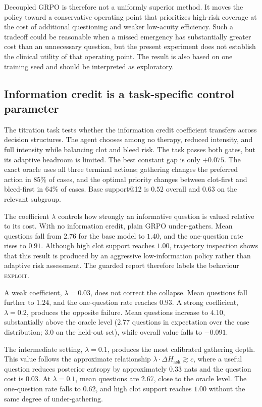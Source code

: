\documentclass{article}
\begin{document}
Decoupled GRPO is therefore not a uniformly superior method. It moves the policy
toward a conservative operating point that prioritizes high-risk coverage at the
cost of additional questioning and weaker low-acuity efficiency. Such a tradeoff
could be reasonable when a missed emergency has substantially greater cost than
an unnecessary question, but the present experiment does not establish the
clinical utility of that operating point. The result is also based on one training
seed and should be interpreted as exploratory.


\FloatBarrier
\subsection{Information credit is a task-specific control parameter}
\label{subsec:titration-results}

The titration task tests whether the information credit coefficient transfers
across decision structures. The agent chooses among no therapy, reduced intensity,
and full intensity while balancing clot and bleed risk. The task passes both gates,
but its adaptive headroom is limited. The best constant gap is only $+0.075$.
The exact oracle uses all three terminal actions; gathering changes the preferred
action in $85\%$ of cases, and the optimal priority changes between clot-first and
bleed-first in $64\%$ of cases. Base support@12 is $0.52$ overall and $0.63$ on
the relevant subgroup.

The coefficient $\lambda$ controls how strongly an informative question is valued
relative to its cost. With no information credit, plain GRPO under-gathers. Mean
questions fall from $2.76$ for the base model to $1.40$, and the one-question
rate rises to $0.91$. Although high clot support reaches $1.00$, trajectory
inspection shows that this result is produced by an aggressive low-information
policy rather than adaptive risk assessment. The guarded report therefore labels
the behaviour \textsc{exploit}.

A weak coefficient, $\lambda{=}0.03$, does not correct the collapse. Mean
questions fall further to $1.24$, and the one-question rate reaches $0.93$. A
strong coefficient, $\lambda{=}0.2$, produces the opposite failure. Mean
questions increase to $4.10$, substantially above the oracle level ($2.77$
questions in expectation over the case distribution; $3.0$ on the held-out set), while overall value falls to $-0.091$.

The intermediate setting, $\lambda{=}0.1$, produces the most calibrated gathering
depth. This value follows the approximate relationship
$\lambda \cdot \Delta H_{\text{ask}} \gtrsim c$, where a useful question reduces
posterior entropy by approximately $0.33$ nats and the question cost is $0.03$.
At $\lambda{=}0.1$, mean questions are $2.67$, close to the oracle level. The one-question rate falls to $0.62$, and high clot support reaches $1.00$ without the
same degree of under-gathering.
\end{document}
